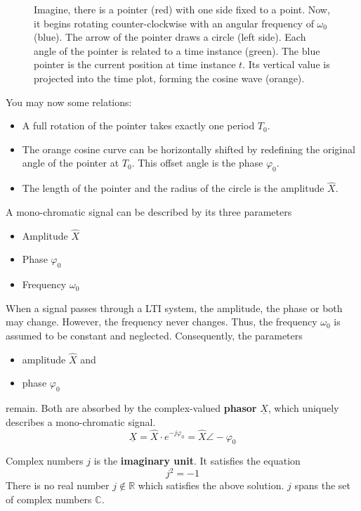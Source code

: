 \begin{refsection}
\begin{figure}[H]
	\caption{Imagine, there is a pointer (red) with one side fixed to a point. Now, it begins rotating counter-clockwise with an angular frequency of $\omega_0$ (blue). The arrow of the pointer draws a circle (left side). Each angle of the pointer is related to a time instance (green). The blue pointer is the current position at time instance $t$. Its vertical value is projected into the time plot, forming the cosine wave (orange).}
	\label{fig:ch02:cos_creation}
\end{figure}

You may now some relations:
\begin{itemize}
	\item A full rotation of the pointer takes exactly one period $T_0$.
	\item The orange cosine curve can be horizontally shifted by redefining the original angle of the pointer at $T_0$. This offset angle is the phase $\varphi_0$.
	\item The length of the pointer and the radius of the circle is the amplitude $\hat{X}$.
\end{itemize}

A mono-chromatic signal can be described by its three parameters
\begin{itemize}
	\item Amplitude $\hat{X}$
	\item Phase $\varphi_0$
	\item Frequency $\omega_0$
\end{itemize}

When a signal passes through a \ac{LTI} system, the amplitude, the phase or both may change. However, the frequency never changes. Thus, the frequency $\omega_0$ is assumed to be constant and neglected. Consequently, the parameters
\begin{itemize}
	\item amplitude $\hat{X}$ and
	\item phase $\varphi_0$
\end{itemize}
remain. Both are absorbed by the complex-valued  \textbf{phasor} $\underline{X}$, which uniquely describes a mono-chromatic signal.
\begin{equation}
	\underline{X} = \hat{X} \cdot e^{-j \varphi_0} = \hat{X} \angle -\varphi_0
\end{equation}

\begin{excursus}{Complex numbers}
	$j$ is the  \textbf{imaginary unit}. It satisfies the equation
	\begin{equation}
		j^2 = -1
	\end{equation}
	There is no real number $j \notin \mathbb{R}$ which satisfies the above solution. $j$ spans the set of complex numbers $\mathbb{C}$.
	

\end{excursus}
\end{refsection}
